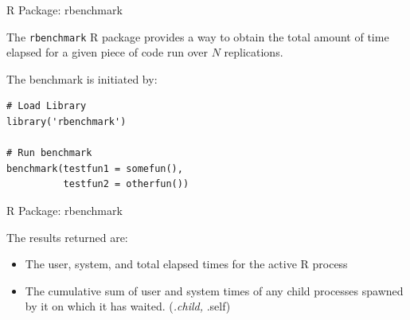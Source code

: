 \begin{frame}[fragile]{R Package: rbenchmark}

The \texttt{rbenchmark} R package provides a way to obtain the total
amount of time elapsed for a given piece of code run over \(N\)
replications.

The benchmark is initiated by:

\begin{verbatim}
# Load Library
library('rbenchmark')

# Run benchmark
benchmark(testfun1 = somefun(),
          testfun2 = otherfun())
\end{verbatim}

\end{frame}

\begin{frame}{R Package: rbenchmark}

The results returned are:

\begin{itemize}
\tightlist
\item
  The user, system, and total elapsed times for the active R process
\item
  The cumulative sum of user and system times of any child processes
  spawned by it on which it has waited. (\emph{.child, }.self)
\end{itemize}

\end{frame}

